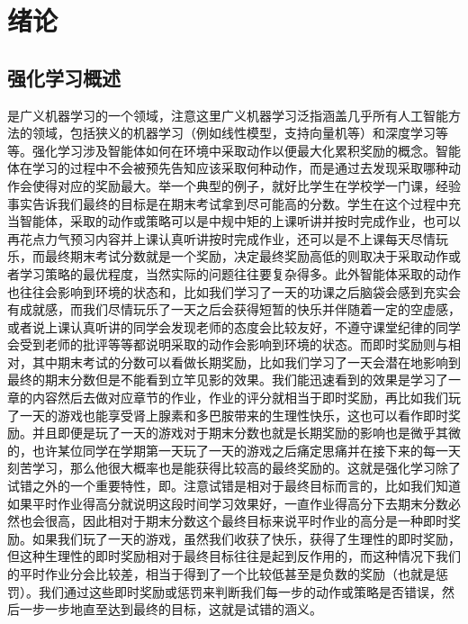\section{绪论}
\setcounter{page}{1}
\subsection{强化学习概述}

 是广义机器学习的一个领域，注意这里广义机器学习泛指涵盖几乎所有人工智能方法的领域，包括狭义的机器学习（例如线性模型，支持向量机等）和深度学习等等。强化学习涉及智能体如何在环境中采取动作以便最大化累积奖励的概念。智能体在学习的过程中不会被预先告知应该采取何种动作，而是通过去发现采取哪种动作会使得对应的奖励最大。举一个典型的例子，就好比学生在学校学一门课，经验事实告诉我们最终的目标是在期末考试拿到尽可能高的分数。学生在这个过程中充当智能体，采取的动作或策略可以是中规中矩的上课听讲并按时完成作业，也可以再花点力气预习内容并上课认真听讲按时完成作业，还可以是不上课每天尽情玩乐，而最终期末考试分数就是一个奖励，决定最终奖励高低的则取决于采取动作或者学习策略的最优程度，当然实际的问题往往要复杂得多。此外智能体采取的动作也往往会影响到环境的状态和，比如我们学习了一天的功课之后脑袋会感到充实会有成就感，而我们尽情玩乐了一天之后会获得短暂的快乐并伴随着一定的空虚感，或者说上课认真听讲的同学会发现老师的态度会比较友好，不遵守课堂纪律的同学会受到老师的批评等等都说明采取的动作会影响到环境的状态。而即时奖励则与相对，其中期末考试的分数可以看做长期奖励，比如我们学习了一天会潜在地影响到最终的期末分数但是不能看到立竿见影的效果。我们能迅速看到的效果是学习了一章的内容然后去做对应章节的作业，作业的评分就相当于即时奖励，再比如我们玩了一天的游戏也能享受肾上腺素和多巴胺带来的生理性快乐，这也可以看作即时奖励。并且即便是玩了一天的游戏对于期末分数也就是长期奖励的影响也是微乎其微的，也许某位同学在学期第一天玩了一天的游戏之后痛定思痛并在接下来的每一天刻苦学习，那么他很大概率也是能获得比较高的最终奖励的。这就是强化学习除了试错之外的一个重要特性，即。注意试错是相对于最终目标而言的，比如我们知道如果平时作业得高分就说明这段时间学习效果好，一直作业得高分下去期末分数必然也会很高，因此相对于期末分数这个最终目标来说平时作业的高分是一种即时奖励。如果我们玩了一天的游戏，虽然我们收获了快乐，获得了生理性的即时奖励，但这种生理性的即时奖励相对于最终目标往往是起到反作用的，而这种情况下我们的平时作业分会比较差，相当于得到了一个比较低甚至是负数的奖励（也就是惩罚）。我们通过这些即时奖励或惩罚来判断我们每一步的动作或策略是否错误，然后一步一步地直至达到最终的目标，这就是试错的涵义。


